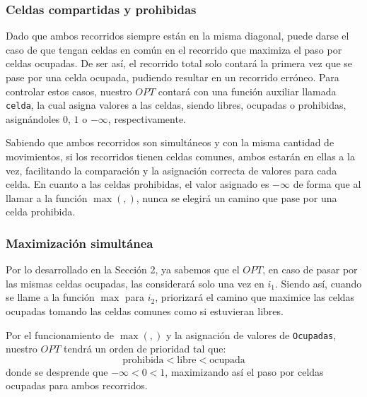 \subsubsection{Celdas compartidas y prohibidas}
Dado que ambos recorridos siempre están en la misma diagonal, puede darse el caso de que tengan celdas en común en el recorrido que maximiza el paso por celdas ocupadas.
De ser así, el recorrido total solo contará la primera vez que se pase por una celda ocupada, pudiendo resultar en un recorrido erróneo.
Para controlar estos casos, nuestro $OPT$ contará con una función auxiliar llamada \texttt{celda}, la cual asigna valores a las celdas, siendo libres, ocupadas o prohibidas,
asignándoles $0$, $1$ o $-\infty$, respectivamente.

Sabiendo que ambos recorridos son simultáneos y con la misma cantidad de movimientos, si los recorridos tienen celdas comunes, ambos estarán en ellas a la vez,
facilitando la comparación y la asignación correcta de valores para cada celda. En cuanto a las celdas prohibidas, el valor asignado es $-\infty$
de forma que al llamar a la función $\max(,)$, nunca se elegirá un camino que pase por una celda prohibida.

\subsubsection{Maximización simultánea}
Por lo desarrollado en la Sección 2, ya sabemos que el $OPT$, en caso de pasar por las mismas celdas ocupadas, las considerará solo una vez en $i_1$.
Siendo así, cuando se llame a la función $\max$ para $i_2$, priorizará el camino que maximice las celdas ocupadas tomando las celdas comunes como si estuvieran libres.

Por el funcionamiento de $\max(,)$ y la asignación de valores de \texttt{Ocupadas}, nuestro $OPT$ tendrá un orden de prioridad tal que:
\[
	\text{prohibida} < \text{libre} < \text{ocupada}
\]
donde se desprende que $-\infty < 0 < 1$, maximizando así el paso por celdas ocupadas para ambos recorridos.
